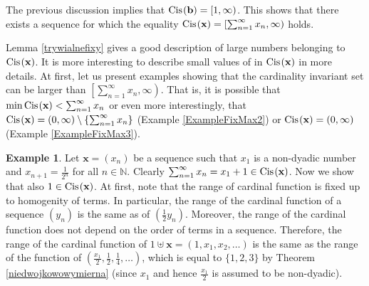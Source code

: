 \documentclass{amsart}
\newtheorem{remark}[theorem]{Remark}
\theoremstyle{definition}
\newtheorem{example}[theorem]{Example}
\newcommand{\Cis}{{\rm Cis} \hspace{0.03cm}}
\begin{document}
The previous discussion implies that $\Cis(\mathbf{b})=[1,\infty)$. This shows that there exists a sequence for which the equality $\Cis (\textbf{x})=[\sum_{n=1}^{\infty}x_n,\infty)$ holds.

Lemma \ref{trywialnefixy} gives a good description of large numbers belonging to $\Cis (\textbf{x})$. It is more interesting to describe small values of in $\Cis (\textbf{x})$ in more details. At first, let us present examples showing that the cardinality invariant set can be larger than $\left[\sum_{n=1}^{\infty}x_n,\infty\right)$. That is, it is possible that $\min\Cis(\textbf{x}) < \sum_{n=1}^{\infty}x_n$ or even more interestingly, that $\Cis(\textbf{x}) = (0,\infty)\setminus\{\sum_{n=1}^{\infty}x_n\}$ (Example \ref{ExampleFixMax2}) or $\Cis(\textbf{x}) = (0,\infty)$ (Example \ref{ExampleFixMax3}). 

\begin{example}
Let $\textbf{x}=(x_n)$ be a sequence such that $x_1$ is a non-dyadic number and $x_{n+1}=\frac{1}{2^n}$ for all $n\in\mathbb{N}$. Clearly $\sum_{n=1}^{\infty}x_n=x_1+1\in \Cis (\textbf{x})$. Now we show that also $1\in \Cis (\textbf{x})$. At first, note that the range of cardinal function is fixed up to homogenity of terms. In particular, the range of the cardinal function of a sequence $(y_n)$ is the same as of $(\frac{1}{2}y_n)$. Moreover, the range of the cardinal function does not depend on the order of terms in a sequence. Therefore, the range of the cardinal function of $1\uplus \textbf{x} = (1,x_{1},x_{2},\ldots )$ is the same as the range of the function of $(\frac{x_{1}}{2},\frac{1}{2},\frac{1}{4},\ldots )$, which is equal to $\{1,2,3\}$ by Theorem \ref{niedwojkowowymierna} (since $x_{1}$ and hence $\frac{x_{1}}{2}$ is assumed to be non-dyadic).
\end{example}

\end{document}
